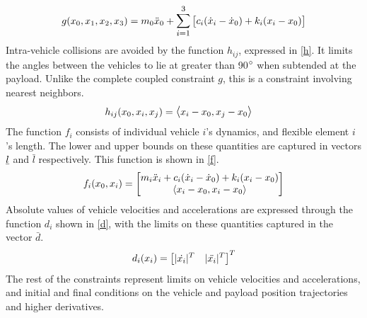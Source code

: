 \documentclass[letterpaper, 10 pt, conference]{ieeeconf}
\newcommand{\ubar}[1]{\text{\b{$#1$}}}
\begin{document}
\begin{equation}\label{g}
\begin{aligned}
g(x_0,x_1,x_2,x_3) &= m_0\ddot{x}_0 +  \mathlarger{\sum\limits_{i=1}^{3}}
\begin{bmatrix}{c_i(\dot{x}_i-\dot{x}_0) + k_i(x_i - x_0)} \end{bmatrix}\\
\end{aligned}
\end{equation}
\noindent
Intra-vehicle collisions are avoided by the function $h_{ij}$, expressed in \eqref{h}. It limits the angles between the vehicles to lie at greater than 90$\degree$ when subtended at the payload. Unlike the complete coupled constraint $g$, this is a constraint involving nearest neighbors.
 \begin{equation}\label{h}
\begin{aligned}
h_{ij}(x_0,x_i,x_j) &= \mathlarger{\langle} x_i - x_0,x_j - x_0 \mathlarger{\rangle}
\end{aligned}
\end{equation}
The function $f_i$ consists of individual vehicle $i$'s dynamics, and flexible element $i$'s length. The lower and upper bounds on these quantities are captured in vectors $\ubar{l}$ and $\bar{l}$ respectively. This function is shown in \eqref{f}. 
 \begin{equation}\label{f}
 \begin{aligned}
 f_i(x_0,x_i) &=
 \begin{bmatrix}
   m_i\ddot{x}_i + c_i(\dot{x}_i-\dot{x}_0) + k_i(x_i-x_0) \\
  \mathlarger{\langle} x_i - x_0,x_i - x_0 \mathlarger{\rangle}
 \end{bmatrix} \\
 \end{aligned}
 \end{equation}
 Absolute values of vehicle velocities and accelerations are expressed through the function $d_i$ shown in \eqref{d}, with the limits on these quantities captured in the vector $\bar{d}$.
 \begin{equation}\label{d}
 \begin{aligned}
 d_i(x_i) &=
 \begin{bmatrix}
  \mathlarger{|}\dot{x_i}\mathlarger{|}^T &\mathlarger{|}\ddot{x_i}\mathlarger{|}^T
 \end{bmatrix}^T \\
 \end{aligned}
 \end{equation}
 The rest of the constraints represent limits on vehicle velocities and accelerations, and initial and final conditions on the vehicle and payload position trajectories and higher derivatives.
\end{document}
